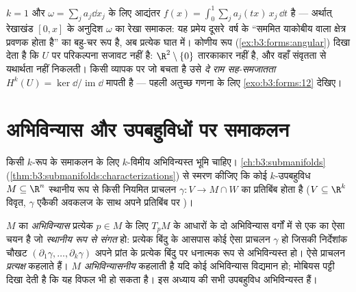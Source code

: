 \begin{remark}
$k = 1$ और $\omega = \sum_j a_j\dd x_j$ के लिए आद्यंतर $f(x) = \int_0^1\sum_ja_j(tx)\,x_j\,\dd t$ है --- अर्थात् रेखाखंड $[0, x]$
के अनुदिश $\omega$ का रेखा समाकल: यह प्रमेय दूसरे~वर्ष के
``सममित याकोबीय वाला क्षेत्र प्रवणक होता है'' का बहु-चर रूप है,
अब प्रत्येक घात में। कोणीय रूप (\cref{ex:b3:forms:angular}) दिखा देता है कि $U$ पर
परिकल्पना सजावट नहीं है: $\R^2\setminus\{0\}$ तारकाकार नहीं है, और वहाँ संवृतता
से यथार्थता नहीं निकलती। किसी व्यापक  पर जो बचता है
उसे \emph{दे राम सह-समजातता} $H^k(U) =
\ker\dd/\operatorname{im}\dd$ मापती है --- पहली अतुच्छ गणना
के लिए \cref{exo:b3:forms:12} देखिए।
\end{remark}

\section{अभिविन्यास और उपबहुविधों पर समाकलन}

किसी $k$-रूप के समाकलन के लिए $k$-विमीय अभिविन्यस्त भूमि
चाहिए। \cref{ch:b3:submanifolds} (\cref{thm:b3:submanifolds:characterizations}) से स्मरण कीजिए कि कोई $k$-उपबहुविध $M \subseteq \R^n$
स्थानीय रूप से किसी नियमित प्राचलन $\gamma\colon V \to M \cap W$ का प्रतिबिंब होता है
($V
\subseteq \R^k$ विवृत, $\gamma$ एकैकी अवकलज के साथ अपने प्रतिबिंब पर
)।

\begin{definition}\label{def:b3:forms:orientation}
$M$ का \emph{अभिविन्यास} प्रत्येक $p \in M$ के
लिए  $T_pM$ के आधारों के दो अभिविन्यास वर्गों में से
एक का ऐसा चयन है जो \emph{स्थानीय रूप से संगत} हो: प्रत्येक बिंदु
के आसपास कोई ऐसा प्राचलन $\gamma$ हो जिसकी निर्देशांक चौखट $(\partial_1\gamma, \dots,
\partial_k\gamma)$
अपने प्रांत के प्रत्येक बिंदु पर धनात्मक रूप से अभिविन्यस्त हो।
ऐसे प्राचलन \emph{प्रत्यक्ष} कहलाते हैं। $M$
\emph{अभिविन्यासनीय} कहलाती है यदि कोई अभिविन्यास विद्यमान हो;
मोबियस पट्टी दिखा देती है कि यह विफल भी हो सकता है। इस अध्याय की
सभी उपबहुविध अभिविन्यस्त हैं।
\end{definition}

